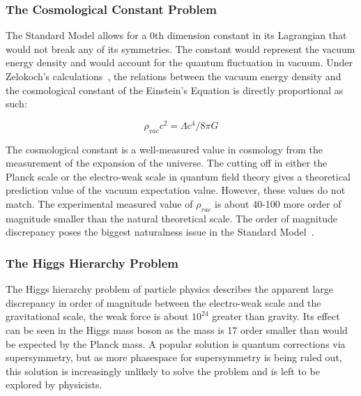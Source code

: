 \subsubsection{The Cosmological Constant Problem}
The Standard Model allows for a 0th dimension constant in its Lagrangian that would not break any of its symmetries. The constant would represent the vacuum energy density and would account for the quantum fluctuation in vacuum. Under Zelokoch's calculations~\cite{zel1968cosmological}, the relations between the vacuum energy density and the cosmological constant of the Einstein's Equation is directly proportional as such:

\begin{equation}
    \rho_{vac}c^2=\Lambda c^4/8\pi G
\label{eq:cosmoconst}
\end{equation}

The cosmological constant is a well-measured value in cosmology from the measurement of the expansion of the universe. The cutting off in either the Planck scale or the electro-weak scale in quantum field theory gives a theoretical prediction value of the vacuum expectation value. However, these values do not match. The experimental measured value of $\rho_{vac}$ is about 40-100 more order of magnitude smaller than the natural theoretical scale. The order of magnitude discrepancy poses the
biggest naturalness issue in the Standard Model~\cite{V2002}.





\subsubsection{The Higgs Hierarchy Problem}
The Higgs hierarchy problem of particle physics describes the apparent large discrepancy in order of magnitude between the electro-weak scale and the gravitational scale, the weak force is about $10^{24}$ greater than gravity. Its effect can be seen in the Higgs mass boson as the mass is 17 order smaller than would be expected by the Planck mass. 
A popular solution is quantum corrections via supersymmetry, but as more phasespace for supersymmetry is being ruled out, this solution is increasingly unlikely to solve the problem and is left to be explored by physicists.

